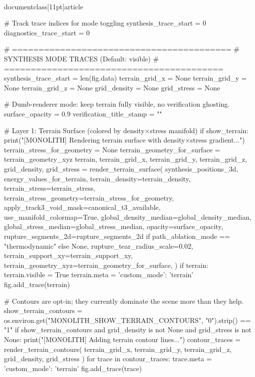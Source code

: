 \\documentclass[11pt]{article}
\begin{document}
\begin{CodeBlock}
{{{{{    # Track trace indices for mode toggling
    synthesis_trace_start = 0
    diagnostics_trace_start = 0

    # =========================================
    # SYNTHESIS MODE TRACES (Default: visible)
    # =========================================
    synthesis_trace_start = len(fig.data)
    terrain_grid_x = None
    terrain_grid_y = None
    terrain_grid_z = None
    grid_density = None
    grid_stress = None

    # Dumb-renderer mode: keep terrain fully visible, no verification ghosting.
    surface_opacity = 0.9
    verification_title_stamp = ""

    # Layer 1: Terrain Surface (colored by density×stress manifold)
    if show_terrain:
        print("[MONOLITH] Rendering terrain surface with density×stress gradient...")
        terrain_stress_for_geometry = None
        terrain_geometry_for_surface = terrain_geometry_xyz
        terrain, terrain_grid_x, terrain_grid_y, terrain_grid_z, grid_density, grid_stress = render_terrain_surface(
            synthesis_positions_3d, energy_values_for_terrain,
            terrain_density=terrain_density,
            terrain_stress=terrain_stress,
            terrain_stress_geometry=terrain_stress_for_geometry,
            apply_track3_void_mask=canonical_t3_available,
            use_manifold_colormap=True,
            global_density_median=global_density_median,
            global_stress_median=global_stress_median,
            opacity=surface_opacity,
            rupture_segments_2d=rupture_segments_2d if path_ablation_mode == "thermodynamic" else None,
            rupture_tear_radius_scale=0.02,
            terrain_support_xy=terrain_support_xy,
            terrain_geometry_xyz=terrain_geometry_for_surface,
        )
        if terrain:
            terrain.visible = True
            terrain.meta = {'custom_mode': 'terrain'}
            fig.add_trace(terrain)
            
            # Contours are opt-in; they currently dominate the scene more than they help.
            show_terrain_contours = os.environ.get("MONOLITH_SHOW_TERRAIN_CONTOURS", "0").strip() == "1"
            if show_terrain_contours and grid_density is not None and grid_stress is not None:
                print("[MONOLITH] Adding terrain contour lines...")
                contour_traces = render_terrain_contours(
                    terrain_grid_x, terrain_grid_y, terrain_grid_z,
                    grid_density, grid_stress
                )
                for trace in contour_traces:
                    trace.meta = {'custom_mode': 'terrain'}
                    fig.add_trace(trace)
    
}}}}}
\end{CodeBlock}
\end{document}
